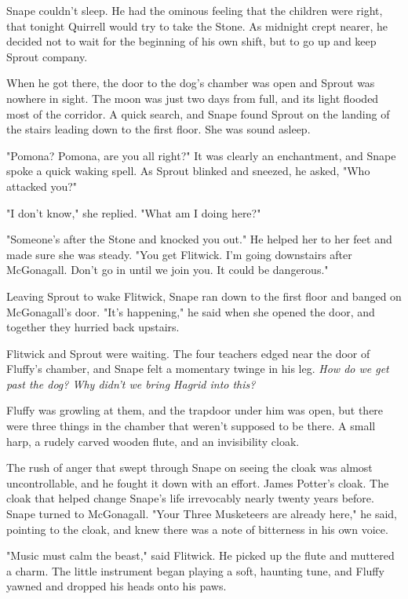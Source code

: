 \sbreak

Snape couldn't sleep. He had the ominous feeling that the children were right, that tonight Quirrell would try to take the Stone. As midnight crept nearer, he decided not to wait for the beginning of his own shift, but to go up and keep Sprout company.

When he got there, the door to the dog's chamber was open and Sprout was nowhere in sight. The moon was just two days from full, and its light flooded most of the corridor. A quick search, and Snape found Sprout on the landing of the stairs leading down to the first floor. She was sound asleep.

"Pomona? Pomona, are you all right?" It was clearly an enchantment, and Snape spoke a quick waking spell. As Sprout blinked and sneezed, he asked, "Who attacked you?"

"I don't know," she replied. "What am I doing here?"

"Someone's after the Stone and knocked you out." He helped her to her feet and made sure she was steady. "You get Flitwick. I'm going downstairs after McGonagall. Don't go in until we join you. It could be dangerous."

Leaving Sprout to wake Flitwick, Snape ran down to the first floor and banged on McGonagall's door. "It's happening," he said when she opened the door, and together they hurried back upstairs.

Flitwick and Sprout were waiting. The four teachers edged near the door of Fluffy's chamber, and Snape felt a momentary twinge in his leg. \emph{How do we get past the dog? Why didn't we bring Hagrid into this?}

Fluffy was growling at them, and the trapdoor under him was open, but there were three things in the chamber that weren't supposed to be there. A small harp, a rudely carved wooden flute, and an invisibility cloak.

The rush of anger that swept through Snape on seeing the cloak was almost uncontrollable, and he fought it down with an effort. James Potter's cloak. The cloak that helped change Snape's life irrevocably nearly twenty years before. Snape turned to McGonagall. "Your Three Musketeers are already here," he said, pointing to the cloak, and knew there was a note of bitterness in his own voice.

"Music must calm the beast," said Flitwick. He picked up the flute and muttered a charm. The little instrument began playing a soft, haunting tune, and Fluffy yawned and dropped his heads onto his paws.

